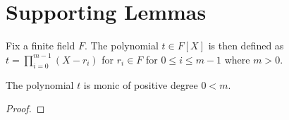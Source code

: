 \chapter{Supporting Lemmas}\label{chap:supporting_lemmas}

\begin{definition}\label{def:poly_t}
\leanok
Fix a finite field $F$. The polynomial $t \in F[X]$ is then defined as $t = \prod_{i = 0}^{m - 1} (X - r_i)$ for $r_i \in F$ for $0 \leq i \leq m-1$ where $m > 0$.
\end{definition}

\begin{lemma}\label{lem:t_props}
\leanok
The polynomial $t$ is monic of positive degree $0 < m$.
\end{lemma}
\begin{proof}
\leanok
\end{proof}